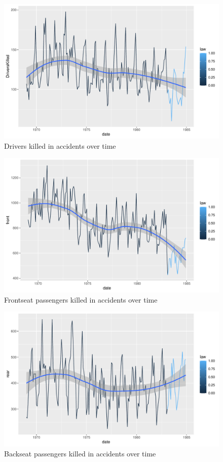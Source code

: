 \documentclass[11pt,a4paper,]{article}
\begin{document}
\begin{figure}
\centering
\includegraphics{report_files/figure-latex/DriversKilled-1.pdf}
\caption{\label{fig:DriversKilled}Drivers killed in accidents over time}
\end{figure}

\begin{figure}
\centering
\includegraphics{report_files/figure-latex/FrontKilled-1.pdf}
\caption{\label{fig:FrontKilled}Frontseat passengers killed in accidents over time}
\end{figure}

\begin{figure}
\centering
\includegraphics{report_files/figure-latex/RearKilled-1.pdf}
\caption{\label{fig:RearKilled}Backseat passengers killed in accidents over time}
\end{figure}
\end{document}
